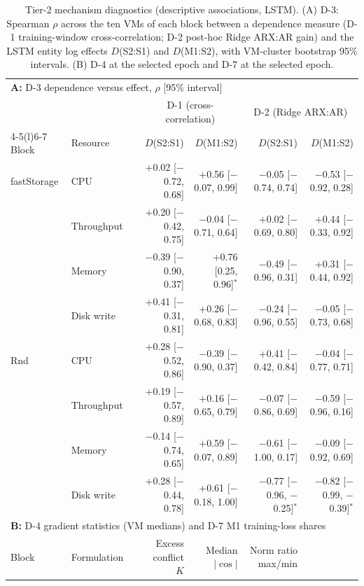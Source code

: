 \documentclass[5p,twocolumn]{elsarticle}
\begin{document}
\begin{table}[t]
  \caption{Tier-2 mechanism diagnostics (descriptive associations, LSTM). (A) D-3: Spearman $\rho$ across the ten VMs of each block between a dependence measure (D-1 training-window cross-correlation; D-2 post-hoc Ridge ARX:AR gain) and the LSTM entity log effects $D$(S2:S1) and $D$(M1:S2), with VM-cluster bootstrap 95\% intervals. (B) D-4 at the selected epoch and D-7 at the selected epoch.}
  \label{tab:tier2-diagnostics}
  \centering
  \small
  \setlength{\tabcolsep}{3pt}
  \begin{tabular*}{\textwidth}{@{\extracolsep{\fill}}lllrrrr@{}}
    \toprule
    \multicolumn{7}{l}{\textbf{A:} D-3 dependence versus effect, $\rho$ [95\% interval]} \\
    & & & \multicolumn{2}{c}{D-1 (cross-correlation)} & \multicolumn{2}{c}{D-2 (Ridge ARX:AR)} \\
    \cmidrule(lr){4-5}\cmidrule(l){6-7}
    Block & Resource & & $D$(S2:S1) & $D$(M1:S2) & $D$(S2:S1) & $D$(M1:S2) \\
    \midrule
    fastStorage & CPU & & +0.02 [$-$0.72, 0.68] & +0.56 [$-$0.07, 0.99] & $-$0.05 [$-$0.74, 0.74] & $-$0.53 [$-$0.92, 0.28] \\
     & Throughput & & +0.20 [$-$0.42, 0.75] & $-$0.04 [$-$0.71, 0.64] & +0.02 [$-$0.69, 0.80] & +0.44 [$-$0.33, 0.92] \\
     & Memory & & $-$0.39 [$-$0.90, 0.37] & +0.76 [0.25, 0.96]$^{*}$ & $-$0.49 [$-$0.96, 0.31] & +0.31 [$-$0.44, 0.92] \\
     & Disk write & & +0.41 [$-$0.31, 0.81] & +0.26 [$-$0.68, 0.83] & $-$0.24 [$-$0.96, 0.55] & $-$0.05 [$-$0.73, 0.68] \\
    Rnd & CPU & & +0.28 [$-$0.52, 0.86] & $-$0.39 [$-$0.90, 0.37] & +0.41 [$-$0.42, 0.84] & $-$0.04 [$-$0.77, 0.71] \\
     & Throughput & & +0.19 [$-$0.57, 0.89] & +0.16 [$-$0.65, 0.79] & $-$0.07 [$-$0.86, 0.69] & $-$0.59 [$-$0.96, 0.16] \\
     & Memory & & $-$0.14 [$-$0.74, 0.65] & +0.59 [$-$0.07, 0.89] & $-$0.61 [$-$1.00, 0.17] & $-$0.09 [$-$0.92, 0.69] \\
     & Disk write & & +0.28 [$-$0.44, 0.78] & +0.61 [$-$0.18, 1.00] & $-$0.77 [$-$0.96, $-$0.25]$^{*}$ & $-$0.82 [$-$0.99, $-$0.39]$^{*}$ \\
    \midrule
    \multicolumn{7}{l}{\textbf{B:} D-4 gradient statistics (VM medians) and D-7 M1 training-loss shares} \\
    Block & Formulation & & Excess conflict $K$ & Median $|\cos|$ & Norm ratio max/min & \\

\end{tabular*}
\end{table}
\end{document}
